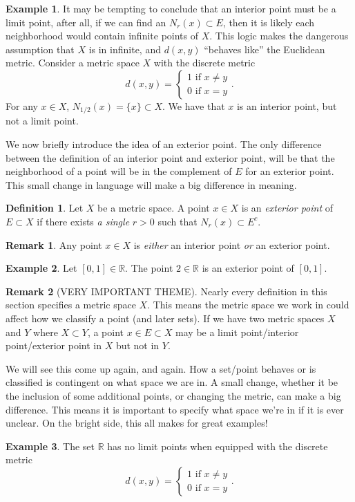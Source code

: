 \documentclass{article}
\newcommand{\R}{\mathbb{R}}
\theoremstyle{definition}
\newtheorem{definition}{Definition}[section]
\newtheorem{example}{Example}[section]
\newtheorem{remark}{Remark}[section]
\begin{document}
\begin{example}
	It may be tempting to conclude that an interior point must be a limit point, after all, if we can find an $ N_r(x)\subset E $, then it is likely each neighborhood would contain infinite points of $ X $. This logic makes the dangerous assumption that $ X $ is in infinite, and $ d(x,y) $ ``behaves like'' the Euclidean metric. Consider a metric space $ X $ with the discrete metric $$ d(x,y)=\begin{cases}
	1\text{ if }x\neq y\\
	0\text{ if }x=y
	\end{cases}.$$ 
	For any $ x\in X $, $ N_{1/2}(x)=\{x\}\subset X $. We have that $ x $ is an interior point, but not a limit point. 
\end{example}
We now briefly introduce the idea of an exterior point. The only difference between the  definition of an interior point and exterior point, will be that the neighborhood of a point will be in the complement of $ E $ for an exterior point. This small change in language will make a big difference in meaning. 
\begin{definition}
Let $ X $ be a metric space. A point $ x\in X$ is an \textit{\color{red}exterior point} of $ E\subset X $ if there exists \textit{a single} $ r>0 $ such that $ N_r(x)\subset E^c $.
\end{definition}
\begin{remark}
Any point $ x\in X $ is \textit{either} an interior point \textit{or} an exterior point.
\end{remark}
\begin{example}
	Let $ [0,1]\in \R $. The point $ 2\in\R $ is an exterior point of $ [0,1] $. 
\end{example} 
\begin{remark}[VERY IMPORTANT THEME]
	Nearly every definition in this section specifies a metric space $ X $. This means the metric space we work in could affect how we classify a point (and later sets). If we have two metric spaces $ X $ and $ Y $ where $ X\subset Y $, a point $ x\in E\subset X $ may be a limit point/interior point/exterior point in $ X $ but not in $ Y $. 
	
	We will see this come up again, and again. How a set/point behaves or is classified is contingent on what space we are in. A small change, whether it be the inclusion of some additional points, or changing the metric, can make a big difference. This means it is important to specify what space we're in if it is ever unclear. On the bright side, this all makes for great examples!   
\end{remark}
\begin{example}
The set $ \R $ has no limit points when equipped with the discrete metric $$ d(x,y)=\begin{cases}
1\text{ if }x\neq y\\
0\text{ if }x=y
\end{cases}.$$  

\end{example}
\end{document}
